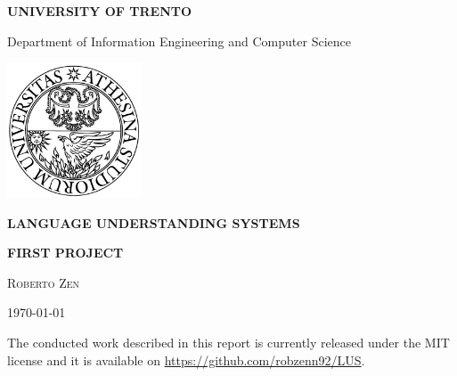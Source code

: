 \begin{titlepage}
	\pagestyle{empty}

	\begin{center}
		{\bfseries\Large {\huge U}NIVERSITY OF {\huge T}RENTO}

		\vspace{0.2cm}

		{\large Department of Information Engineering and Computer Science}

		\vspace{0.5cm}

		\begin{center}
			\includegraphics[width=0.3\textwidth]{res/unitn}
		\end{center}

		\vspace{2.5cm}

		{\Large \bfseries {{\huge L}ANGUAGE {\huge U}NDERSTANDING} {\huge S}YSTEMS}

		\vspace{0.5cm}

		{\Large \bfseries {FIRST PROJECT}}

		\vspace{1.5cm}
		
		{\large \textsc{Roberto Zen}}

		\vspace{1.0cm}
		
		{\today}

		\vspace{6.0cm}

		\small{The conducted work described in this report is currently released under the MIT license and it is available on \url{https://github.com/robzenn92/LUS}.}

		\vfill

	\end{center}

\end{titlepage}
